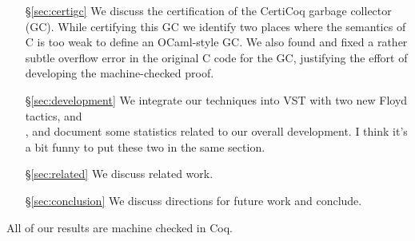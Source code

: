 \begin{itemize}
\item[\S\ref{sec:certigc}] We discuss the certification of the CertiCoq garbage collector (GC). While certifying this GC we identify two places where the semantics of C is too weak to define an OCaml-style GC. We also found and fixed a rather subtle overflow error in the original C code for the GC, justifying the effort of developing the machine-checked proof.
\item[\S\ref{sec:development}] We integrate our techniques into VST with two new Floyd 
tactics,  and \\ , and document some statistics related to our 
overall development. {\color{blue} I think it's a bit funny to put these two in the same 
section.}
\item[\S\ref{sec:related}] We discuss related work.
\item[\S\ref{sec:conclusion}] We discuss directions for future work and conclude.
\end{itemize}
All of our results are machine checked in Coq.

